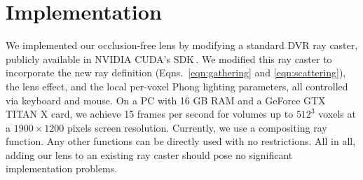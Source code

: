 \section{Implementation}
\label{sec:implem}
%
We implemented our occlusion-free lens by modifying a standard DVR ray caster, publicly available in NVIDIA CUDA's SDK\,\cite{cudasdk}. We modified this ray caster to incorporate the new ray definition (Eqns.~\ref{eqn:gathering} and \ref{eqn:scattering}), the lens effect, and the local per-voxel Phong lighting parameters, all controlled via keyboard and mouse. On a PC with 16 GB RAM and a GeForce GTX TITAN X card, we achieve 15 frames per second for volumes up to $512^3$ voxels at a $1900 \times 1200$ pixels screen resolution. Currently, we use a compositing ray function. Any other functions can be directly used with no restrictions. All in all, adding our lens to an existing ray caster should pose no significant implementation problems.

